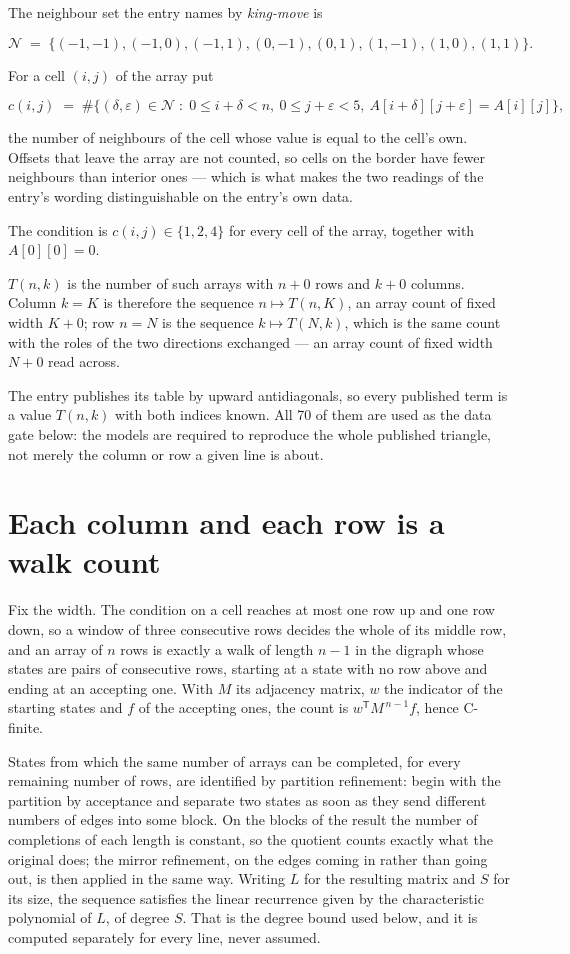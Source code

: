\documentclass[11pt]{article}
\theoremstyle{definition}
\begin{document}
The neighbour set the entry names by {\itshape king-move} is

\[\mathcal{N} \;=\; \{(-1,-1), (-1,0), (-1,1), (0,-1), (0,1), (1,-1), (1,0), (1,1)\}.\]

For a cell $(i,j)$ of the array put

\[c(i,j) \;=\; \#\bigl\{(\delta,\varepsilon)\in\mathcal{N} \;:\; 0\le i+\delta<n,\ 0\le j+\varepsilon<5,\ A[i+\delta][j+\varepsilon] = A[i][j]\bigr\},\]

the number of neighbours of the cell whose value is equal to the cell's own. Offsets that leave the array are not counted, so cells on the border have fewer neighbours than interior ones --- which is what makes the two readings of the entry's wording distinguishable on the entry's own data.

The condition is $c(i,j) \in \{1, 2, 4\}$ for every cell of the array, together with $A[0][0]=0$.

$T(n,k)$ is the number of such arrays with $n + 0$ rows and $k + 0$ columns. Column $k = K$ is therefore the sequence $n \mapsto T(n,K)$, an array count of fixed width $K + 0$; row $n = N$ is the sequence $k \mapsto T(N,k)$, which is the same count with the roles of the two directions exchanged --- an array count of fixed width $N + 0$ read across.

The entry publishes its table by upward antidiagonals, so every published term is a value $T(n,k)$ with both indices known. All 70 of them are used as the data gate below: the models are required to reproduce the whole published triangle, not merely the column or row a given line is about.

\section{Each column and each row is a walk count}

Fix the width. The condition on a cell reaches at most one row up and one row down, so a window of three consecutive rows decides the whole of its middle row, and an array of $n$ rows is exactly a walk of length $n-1$ in the digraph whose states are pairs of consecutive rows, starting at a state with no row above and ending at an accepting one. With $M$ its adjacency matrix, $w$ the indicator of the starting states and $f$ of the accepting ones, the count is $w^{\mathsf T}M^{\,n-1}f$, hence C-finite.

States from which the same number of arrays can be completed, for every remaining number of rows, are identified by partition refinement: begin with the partition by acceptance and separate two states as soon as they send different numbers of edges into some block. On the blocks of the result the number of completions of each length is constant, so the quotient counts exactly what the original does; the mirror refinement, on the edges coming in rather than going out, is then applied in the same way. Writing $L$ for the resulting matrix and $S$ for its size, the sequence satisfies the linear recurrence given by the characteristic polynomial of $L$, of degree $S$. That is the degree bound used below, and it is computed separately for every line, never assumed.
\end{document}
